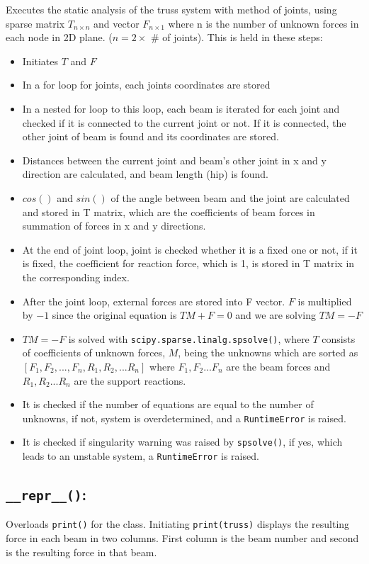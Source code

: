 \documentclass[10pt]{article}
\begin{document}
Executes the static analysis of the truss system with method of
joints, using sparse matrix $T_{n\times n}$ and  vector $F_{n\times 1}$ where n 
is the number of unknown forces in each node in 2D plane. 
($n = 2 \times$ \# of joints). This is held in these steps:
\begin{itemize}
    \item Initiates $T$ and $F$
    \item In a for loop for joints, each joints coordinates are stored
    \item In a nested for loop to this loop, each beam is iterated for each joint and checked if it is connected to the current joint or not. If it is connected, the other joint of beam is found and its coordinates are stored.
    \item Distances between the current joint and beam's other joint in x and y direction are calculated, and beam length (hip) is found.
    \item $cos()$ and $sin()$ of the angle between beam and the joint are calculated and stored in T matrix, which are the coefficients of beam forces in summation of forces in x and y directions. 
    \item At the end of joint loop, joint is checked whether it is a fixed one or not, if it is fixed, the coefficient for reaction force, which is 1, is stored in T matrix in the corresponding index.
    \item After the joint loop, external forces are stored into F vector. $F$ is multiplied by $-1$ since the original equation is $TM+F=0$ and we are solving $TM=-F$
    \item $TM=-F$ is solved with \texttt{scipy.sparse.linalg.spsolve()}, where $T$ consists of coefficients of unknown forces, $M$, being the unknowns which are sorted as $[F_1,F_2,...,F_n,R_1,R_2,...R_n]$ where $F_1,F_2...F_n$ are the beam forces and $R_1,R_2...R_n$ are the support reactions.
    \item It is checked if the number of equations are equal to the number of unknowns, if not, system is overdetermined, and a \texttt{RuntimeError} is raised.
    \item It is checked if singularity warning was raised by \texttt{spsolve()}, if yes, which leads to an unstable system, a \texttt{RuntimeError} is raised.
\end{itemize}

\subsection*{\texttt{\_\_repr\_\_()}:}
Overloads \texttt{print()} for the class. Initiating \texttt{print(truss)} displays
the resulting force in each beam in two columns. First column is the
beam number and second is the resulting force in that beam.

 
\end{document}
